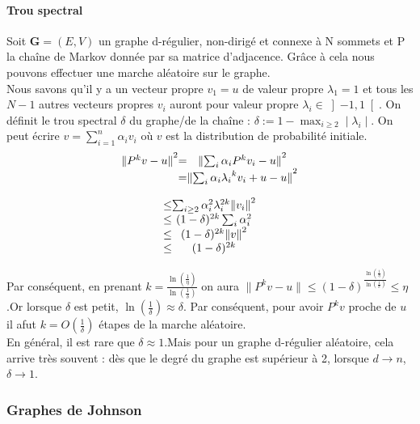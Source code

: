 \documentclass[12pt,openany]{report}
\begin{document}
\paragraph{Trou spectral} Soit $\mathbf{G} = (E, V )$ un graphe d-régulier, non-dirigé et connexe à
N sommets et P la chaîne de Markov donnée par sa matrice d’adjacence. Grâce
à cela nous pouvons effectuer une marche aléatoire sur le graphe.\\

Nous savons qu’il y a un vecteur propre $v_1 = u$ de valeur propre $\lambda_1 = 1$ et tous les $N-1$ autres vecteurs propres $v_i$ auront pour valeur propre $\lambda_i \in \left]-1,1 \right[  $.
On définit le trou spectral $\delta$ du graphe/de la chaîne : $\delta := 1-\max_{i\geq 2} \mid \lambda_i \mid$.
On peut écrire $v=\sum_{i=1}^{n} \alpha_i v_i$ où $v$ est la distribution de probabilité initiale.
\[
\left.
\begin{array}{c @{=}c }
    {\lVert P^{k}v-u \rVert}^2& {\lVert \sum_{i}\alpha_i P^k v_i - u \rVert}^2 \\
& {\lVert \sum_{i}\alpha_i {\lambda_i}^k v_i+u - u \rVert}^2 \\
 
\end{array}
\right.
\]

\[
\left.
\begin{array}{c @{\leq}c }
   
&  \sum_{i\geq 2}\alpha_i^{2}\lambda_i^{2k}{\lVert v_i \rVert}^2 \\
& (1-\delta)^{2k}\sum_{i}\alpha_i^{2} \\
& (1-\delta)^{2k}{\lVert v \rVert }^2 \\
& (1-\delta)^{2k} 
 
\end{array}
\right.
\]



Par conséquent, en prenant $k=\frac{\ln(\frac{1}{\eta})}{\ln(\frac{1}{\delta})}$ on aura $\lVert P^{k}v-u \rVert\leq (1-\delta)^{\frac{\ln(\frac{1}{\eta})}{\ln(\frac{1}{\delta})}} \leq \eta $.Or lorsque $\delta $ est petit, $\ln(\frac{1}{\delta}) \approx \delta $. Par conséquent, pour avoir $ P^{k}v $ proche de $u$ il afut $k=O(\frac{1}{\delta})$ étapes de la marche aléatoire.\\
En général, il est rare que $\delta \approx 1 $.Mais pour un graphe d-régulier aléatoire, cela
arrive très souvent : dès que le degré du graphe est supérieur à 2, lorsque $d\rightarrow n$,
$\delta \rightarrow 1$. 
\subsubsection{Graphes de Johnson}
\end{document}

